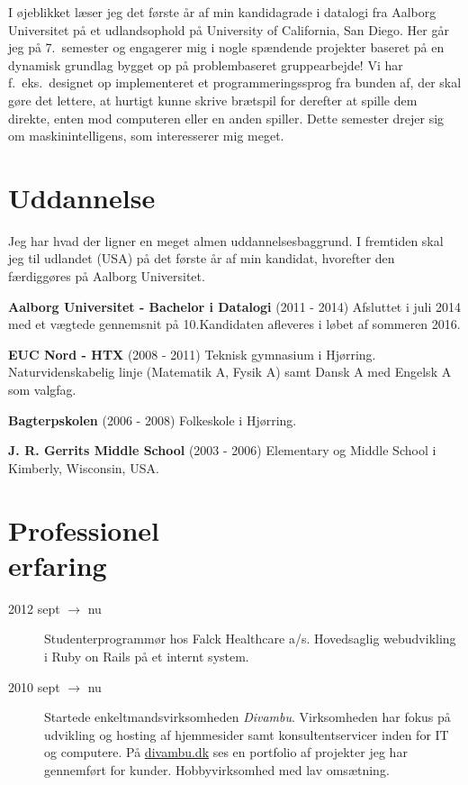 \documentclass[margin,line,a4paper]{resume}
\begin{document}
\begin{resume}
    I øjeblikket læser jeg det første år af min kandidagrade i datalogi
    fra Aalborg Universitet på et udlandsophold på University of
    California, San Diego. Her går jeg på 7.\ semester og engagerer mig
    i nogle spændende projekter baseret på en dynamisk grundlag bygget
    op på problembaseret gruppearbejde! Vi har f.\ eks.\ designet op
    implementeret et programmeringssprog fra bunden af, der skal gøre
    det lettere, at hurtigt kunne skrive brætspil for derefter at spille
    dem direkte, enten mod computeren eller en anden spiller. Dette
    semester drejer sig om maskinintelligens, som interesserer mig
    meget.

    \section{\mysidestyle Uddannelse}
    Jeg har hvad der ligner en meget almen uddannelsesbaggrund. I
    fremtiden skal jeg til udlandet (USA) på det første år af min
    kandidat, hvorefter den færdiggøres på Aalborg Universitet.

    \textbf{Aalborg Universitet - Bachelor i Datalogi}
      (2011 - 2014) Afsluttet i juli 2014 med et vægtede gennemsnit på
      10.Kandidaten afleveres i løbet af sommeren 2016.

    \textbf{EUC Nord - HTX} (2008 - 2011) Teknisk gymnasium i Hjørring.
      Naturvidenskabelig linje (Matematik A, Fysik A) samt Dansk A med
      Engelsk A som valgfag.

    \textbf{Bagterpskolen} (2006 - 2008) Folkeskole i Hjørring.

    \textbf{J. R. Gerrits Middle School} (2003 - 2006) Elementary og
      Middle School i Kimberly, Wisconsin, USA.

\section{\mysidestyle Professionel\\erfaring}\vspace{1mm}
\begin{description}

  \item[2012 sept $\rightarrow$ nu] Studenterprogrammør hos Falck
    Healthcare a/s. Hovedsaglig webudvikling i Ruby on Rails på et internt
    system.

  \item[2010 sept $\rightarrow$ nu] Startede enkeltmandsvirksomheden
    \emph{Divambu}. Virksomheden har fokus på udvikling og hosting af
    hjemmesider samt konsultentservicer inden for IT og computere. På
    \url{divambu.dk} ses en portfolio af projekter jeg har gennemført for
    kunder. Hobbyvirksomhed med lav omsætning.


\end{description}
\end{resume}
\end{document}
